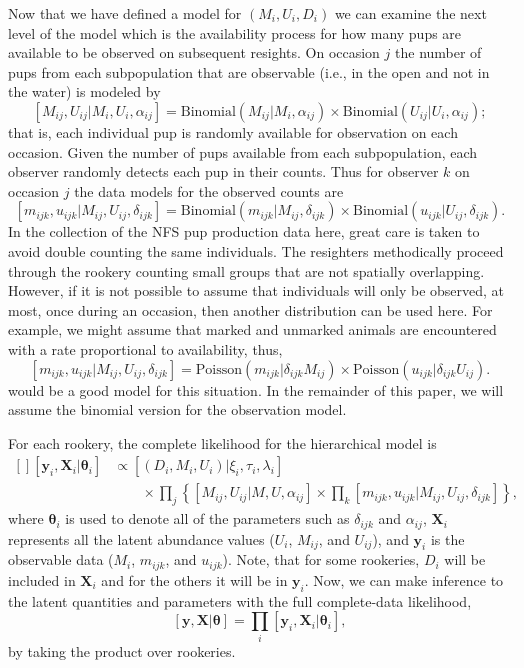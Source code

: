 \documentclass[fleqn,10pt]{wlscirep}
\begin{document}
{Now that we have defined a model for \((M_i, U_i, D_i)\) we can examine the next level of the model which is the availability process for how many pups are available to be observed on subsequent resights. On occasion \(j\) the number of pups from each subpopulation that are observable (i.e., in the open and not in the water) is modeled by
\[
[M_{ij}, U_{ij}|M_i,U_i,\alpha_{ij}] =\text{Binomial}(M_{ij}|M_i,\alpha_{ij}) \times \text{Binomial}(U_{ij}|U_i,\alpha_{ij});
\]
that is, each individual pup is randomly available for observation on each occasion. Given the number of pups available from each subpopulation, each observer randomly detects each pup in their counts. Thus for observer \(k\) on occasion \(j\) the data models for the observed counts are
\[
[m_{ijk}, u_{ijk} |M_{ij},U_{ij},\delta_{ijk}] = \text{Binomial}(m_{ijk}|M_{ij},\delta_{ijk}) \times \text{Binomial}(u_{ijk}|U_{ij},\delta_{ijk}).
\]
In the collection of the NFS pup production data here, great care is taken to avoid double counting the same individuals. The resighters methodically proceed through the rookery counting small groups that are not spatially overlapping. However, if it is not possible to assume that individuals will only be observed, at most, once during an occasion, then another distribution can be used here. For example, we might assume that marked and unmarked animals are encountered with a rate proportional to availability, thus,
\[
[m_{ijk}, u_{ijk} |M_{ij},U_{ij},\delta_{ijk}] = \text{Poisson}(m_{ijk}|\delta_{ijk}M_{ij}) \times \text{Poisson}(u_{ijk}|\delta_{ijk}U_{ij}).
\]
would be a good model for this situation. In the remainder of this paper, we will assume the binomial version for the observation model.

For each rookery, the complete likelihood for the hierarchical model is
\[
\begin{aligned}[]
[\mathbf{y}_i,\mathbf{X}_i|\boldsymbol{\theta}_i] &\propto [(D_i, M_i, U_i)|\xi_i, \tau_i, \lambda_i]\\
& \qquad \times \prod_j \left\{[M_{ij}, U_{ij}|M,U,\alpha_{ij}]\times \prod_k [m_{ijk}, u_{ijk} |M_{ij},U_{ij},\delta_{ijk}]\right\},
\end{aligned}
\]
where \(\boldsymbol{\theta}_i\) is used to denote all of the parameters such as \(\delta_{ijk}\) and \(\alpha_{ij}\), \(\mathbf{X}_i\) represents all the latent abundance values (\(U_i\), \(M_{ij}\), and \(U_{ij}\)), and \(\mathbf{y}_i\) is the observable data (\(M_i\), \(m_{ijk}\), and \(u_{ijk}\)). Note, that for some rookeries, \(D_i\) will be included in \(\mathbf{X}_i\) and for the others it will be in \(\mathbf{y}_i\). Now, we can make inference to the latent quantities and parameters with the full complete-data likelihood,
\[
[\mathbf{y},\mathbf{X}|\boldsymbol{\theta}] = \prod_i [\mathbf{y}_i,\mathbf{X}_i|\boldsymbol{\theta}_i],
\]
by taking the product over rookeries.

}
\end{document}
